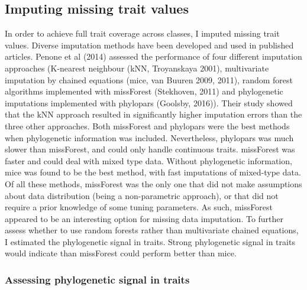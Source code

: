 \subsection{Imputing missing trait values}
In order to achieve full trait coverage across classes, I imputed missing trait values. Diverse imputation methods have been developed and used in published articles. Penone et al (2014) assessed the performance of four different imputation approaches (K-nearest neighbour (kNN, Troyanskaya 2001), multivariate imputation by chained equations (mice, van Buuren 2009, 2011), random forest algorithms implemented with missForest (Stekhoven, 2011) and phylogenetic imputations implemented with phylopars (Goolsby, 2016)). Their study showed that the kNN approach resulted in significantly higher imputation errors than the three other approaches. Both missForest and phylopars were the best methods when phylogenetic information was included. Nevertheless, phylopars was much slower than missForest, and could only handle continuous traits. missForest was faster and could deal with mixed type data. Without phylogenetic information, mice was found to be the best method, with fast imputations of mixed-type data. Of all these methods, missForest was the only one that did not make assumptions about data distribution (being a non-parametric approach), or that did not require a prior knowledge of some tuning parameters. As such, missForest appeared to be an interesting option for missing data imputation. To further assess whether to use random forests rather than multivariate chained equations, I estimated the phylogenetic signal in traits. Strong phylogenetic signal in traits would indicate than missForest could perform better than mice.

\subsubsection{Assessing phylogenetic signal in traits}

